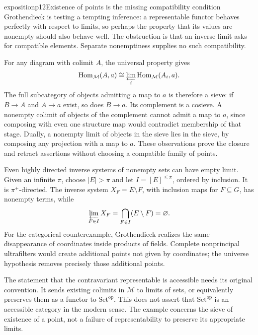 \begin{dcomment}{exposition}{p12}{Existence of points is the missing compatibility condition}
Grothendieck is testing a tempting inference: a representable functor behaves perfectly with respect to limits, so perhaps the property that its values are nonempty should also behave well. The obstruction is that an inverse limit asks for compatible elements. Separate nonemptiness supplies no such compatibility.

For any diagram with colimit $A$, the universal property gives
\[
 \operatorname{Hom}_{\mathcal M}(A,a)
   \cong\varprojlim_i\operatorname{Hom}_{\mathcal M}(A_i,a).
\]
The full subcategory of objects admitting a map to $a$ is therefore a sieve: if $B\to A$ and $A\to a$ exist, so does $B\to a$. Its complement is a cosieve. A nonempty colimit of objects of the complement cannot admit a map to $a$, since composing with even one structure map would contradict membership of that stage. Dually, a nonempty limit of objects in the sieve lies in the sieve, by composing any projection with a map to $a$. These observations prove the closure and retract assertions without choosing a compatible family of points.

Even highly directed inverse systems of nonempty sets can have empty limit. Given an infinite $\pi$, choose $|E|>\pi$ and let $I=[E]^{\le\pi}$, ordered by inclusion. It is $\pi^+$-directed. The inverse system $X_F=E\setminus F$, with inclusion maps for $F\subseteq G$, has nonempty terms, while
\[
 \varprojlim_{F\in I}X_F
    =\bigcap_{F\in I}(E\setminus F)=\varnothing.
\]
For the categorical counterexample, Grothendieck realizes the same disappearance of coordinates inside products of fields. Complete nonprincipal ultrafilters would create additional points not given by coordinates; the universe hypothesis removes precisely those additional points.

The statement that the contravariant representable is accessible needs its original convention. It sends existing colimits in $\mathcal M$ to limits of sets, or equivalently preserves them as a functor to $\mathrm{Set}^{\mathrm{op}}$. This does not assert that $\mathrm{Set}^{\mathrm{op}}$ is an accessible category in the modern sense. The example concerns the sieve of existence of a point, not a failure of representability to preserve its appropriate limits.
\end{dcomment}

